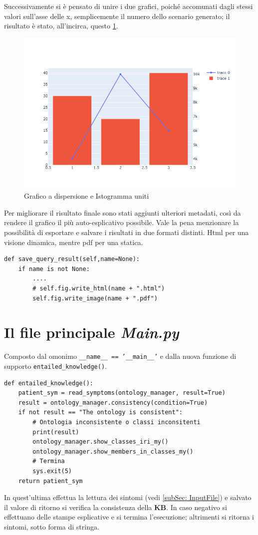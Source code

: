 Successivamente si è pensato di unire i due grafici, poiché accomunati dagli stessi valori sull'asse delle x,
semplicemente il numero dello scenario generato; il risultato è stato, all'incirca, questo \ref{fig:duePlotUniti}.\\
\begin{figure}[h]
	\includegraphics[width=\linewidth]{plot/plot_mixed.png}
	\caption{Grafico a dispersione e Istogramma uniti}
	\centering
	\label{fig:duePlotUniti}
\end{figure}
Per migliorare il risultato finale sono stati aggiunti ulteriori metadati, così da rendere il grafico
il più auto-esplicativo possibile. Vale la pena menzionare la possibilità di esportare e salvare i risultati
in due formati distinti. Html per una visione dinamica, mentre pdf per una statica.
\begin{verbatim}
def save_query_result(self,name=None):
	if name is not None:
		....
		# self.fig.write_html(name + ".html")
		self.fig.write_image(name + ".pdf")
\end{verbatim}
\clearpage

\section{Il file principale \emph{Main.py}}
Composto  dal omonimo \texttt{__name__ == '__main__'} e dalla nuova funzione di 
supporto \texttt{entailed_knowledge()}.
\begin{verbatim}
def entailed_knowledge():
	patient_sym = read_symptoms(ontology_manager, result=True)
	result = ontology_manager.consistency(condition=True)
	if not result == "The ontology is consistent":
		# Ontologia inconsistente o classi inconsitenti
		print(result)
		ontology_manager.show_classes_iri_my()
		ontology_manager.show_members_in_classes_my()
		# Termina
		sys.exit(5)
	return patient_sym
\end{verbatim}
In quest'ultima effettua la lettura dei sintomi (vedi \ref{subSec: InputFile}) e salvato il
valore di ritorno si verifica la consistenza della \textbf{KB}. In caso negativo si effettuano delle stampe esplicative e si termina l'esecuzione; altrimenti si ritorna i sintomi, sotto forma di stringa.
                
